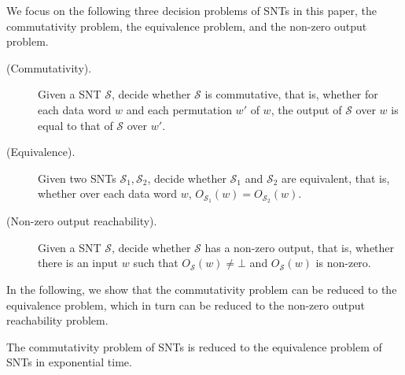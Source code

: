 \documentclass[runningheads,a4paper]{llncs}
\def\Ss{{\mathcal{S} }}
\newcommand\cur{\mathsf{cur}}
\newcommand\vars{\mathsf{vars}}
\newcommand\dom{\mathsf{dom}}
\newcommand\defval{\mathsf{DEF}}
\begin{document}
%
%
%




We focus on the following three decision problems of SNTs in this paper, the commutativity problem, the equivalence problem, and the non-zero output problem.
\begin{description}
\item[(Commutativity).] Given a SNT $\Ss$, decide whether $\Ss$ is commutative, that is, whether for each data word $w$ and each permutation $w'$ of $w$, the output of $\Ss$ over $w$ is equal to that of $\Ss$ over $w'$.
%
\item[(Equivalence).] Given two SNTs $\Ss_1,\Ss_2$, decide whether $\Ss_1$ and $\Ss_2$ are equivalent, that is, whether over each data word $w$, $O_{\Ss_1}(w)=O_{\Ss_2}(w)$.
%
\item[(Non-zero output reachability).] Given a SNT $\Ss$, decide whether $\Ss$ has a non-zero output, that is, whether there is an input $w$ such that $O_{\Ss}(w) \neq \bot$ and $O_{\Ss}(w)$ is non-zero. 
\end{description}
In the following, we show that the commutativity problem can be reduced to the equivalence problem, which in turn can be reduced to the non-zero output reachability problem.


\begin{proposition}\label{prop-snt-cmm-to-eqv}
The commutativity problem of SNTs is reduced to the equivalence problem of SNTs in exponential time. 
\end{proposition}
\end{document}
